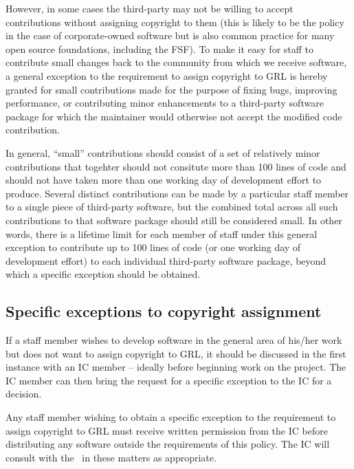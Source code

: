 \documentclass[10pt,a4paper]{article}
\begin{document}
\begin{itemize}
\par However, in some cases the third-party may not be willing to accept contributions 
without assigning copyright to them (this is likely to be the policy in the case of 
corporate-owned software but is also common practice for many open source 
foundations, including the FSF). To make it easy for staff to contribute small 
changes back to the community from which we receive software, a general 
exception to the requirement to assign copyright to GRL is hereby granted for 
small contributions made for the purpose of fixing bugs, improving performance, 
or contributing minor enhancements to a third-party software package for which 
the maintainer would otherwise not accept the modified code contribution. 

\par In general, ``small'' contributions should consist of a set of relatively minor 
contributions that togehter should not consitute more than 100 lines of code 
and should not have taken more than one working day of development effort 
to produce. Several distinct contributions can be made by a particular staff 
member to a single piece of third-party software, but the combined total across 
all such contributions to that software package should still be considered small. 
In other words, there is a lifetime limit for each member of staff under this general 
exception to contribute up to 100 lines of code (or one working day of 
development effort) to each individual third-party software package, beyond 
which a specific exception should be obtained. 

\end{itemize}


\subsection{Specific exceptions to copyright assignment}
\label{section:exceptions.special}

\par If a staff member wishes to develop software in the general area of his/her work 
but does not want to assign copyright to GRL, it should be discussed in the first 
instance with an IC member -- ideally before beginning work on the project. The IC 
member can then bring the request for a specific exception to the IC for a decision. 

\par Any staff member wishing to obtain a specific exception to the requirement to 
assign copyright to GRL must receive written permission from the IC before 
distributing any software outside the requirements of this policy. The IC will consult 
with the \exectitle\ in these matters as appropriate. 
\end{document}
